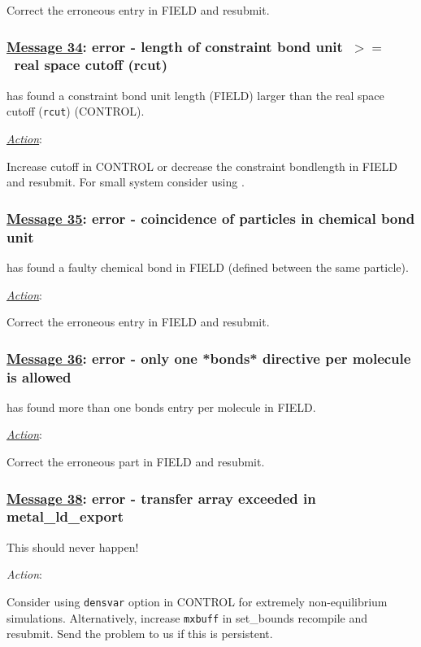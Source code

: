 Correct the erroneous entry in FIELD and resubmit.

\subsubsection*{\underline{Message 34}: error - length of constraint bond unit~$>=$~real space cutoff (rcut)}

\D has found a constraint bond unit length (FIELD) larger than the
real space cutoff ({\tt rcut}) (CONTROL).

\noindent \underline{\em Action}:

Increase cutoff in CONTROL or decrease the constraint bondlength
in FIELD and resubmit.  For small system consider using \C.

\subsubsection*{\underline{Message 35}: error - coincidence of particles in chemical bond unit}

\D has found a faulty chemical bond in FIELD (defined between the
same particle).

\noindent \underline{\em Action}:

Correct the erroneous entry in FIELD and resubmit.

\subsubsection*{\underline{Message 36}: error - only one *bonds* directive per molecule is allowed}

\D has found more than one bonds entry per molecule in FIELD.

\noindent \underline{\em Action}:

Correct the erroneous part in FIELD and resubmit.

\subsubsection*{\underline{Message 38}: error - transfer array exceeded in metal\_ld\_export}

This should never happen!

{\em Action}:

Consider using {\tt densvar} option in CONTROL for extremely
non-equilibrium simulations.  Alternatively, increase {\tt mxbuff}
in {\sc set\_bounds} recompile and resubmit.  Send the problem to
us if this is persistent.

